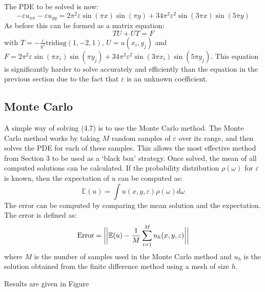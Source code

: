 \documentclass{article}
\numberwithin{equation}{section}
\begin{document}
The PDE to be solved is now:
\begin{equation}
- \varepsilon u_{xx} - \varepsilon u_{yy} = 2\pi^2 \varepsilon \sin(\pi x) \sin(\pi y)+ 34 \pi^2 \varepsilon^2 \sin(3 \pi x) \sin(5 \pi y)
\end{equation}
As before this can be formed as a matrix equation:
\begin{equation}
TU + UT = F
\end{equation}
with $T = -\frac{\varepsilon}{h^2} \text{tridiag}(1,-2,1)$, $U = u(x_i, y_j)$ and $F = 2\pi^2 \varepsilon \sin(\pi x_i) \sin(\pi y_j)+ 34 \pi^2 \varepsilon^2 \sin(3 \pi x_i) \sin(5 \pi y_j)$. This equation is significantly harder to solve accurately and efficiently than the equation in the previous section due to the fact that $\varepsilon$ is an unknown coefficient.

\subsection{Monte Carlo}
A simple way of solving (4.7) is to use the Monte Carlo method. The Monte Carlo method works by taking $M$ random samples of $\varepsilon$ over its range, and then solves the PDE for each of these samples. 
This allows the most effective method from Section 3 to be used as a `black box' strategy. Once solved, the mean of all computed solutions can be calculated. If the probability distribution $\rho(\omega)$ for $\varepsilon$ is known, then the expectation of $u$ can be computed as:
\begin{equation}
\mathbb{E}(u) = \int u(x,y,\varepsilon) \rho(\omega) d \omega
\end{equation}
The error can be computed by comparing the mean solution and the expectation. The error is defined as: 
\begin{equation}
\text{Error} = \bigg{|} \bigg{|} \mathbb{E}(u) - \frac{1}{M} \sum_{i=1}^M u_h (x, y, \varepsilon) \bigg{|}\bigg{|}
\end{equation}
where $M$ is the number of samples used in the Monte Carlo method and $u_h$ is the solution obtained from the finite difference method using a mesh of size $h$.

Results are given in Figure 


\newpage



\end{document}

